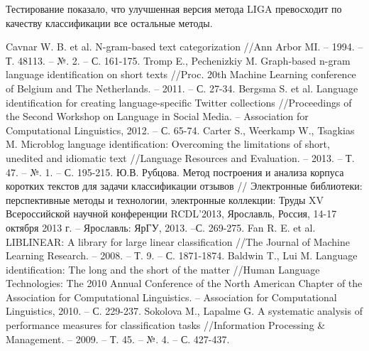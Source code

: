 \documentclass[a4paper, 14pt]{article}
\makeatletter
\renewcommand\appendixname{Приложение}
\def\redeflsection{\def\l@section{\@dottedtocline{1}{1.5em}{7.8em}}}
\renewcommand\appendix{\par
\setcounter{section}{0}%
\setcounter{subsection}{0}%
\def\@chapapp{\appendixname}%
\addtocontents{toc}{\protect\redeflsection}
\def\thesection{\appendixname\hspace{0.2cm}\@arabic\c@section}}
\makeatother
\begin{document}
		Тестирование показало, что улучшенная версия метода LIGA превосходит по качеству классификации все остальные методы.
		


  \begin{thebibliography}{99}
     Cavnar W. B. et al. N-gram-based text categorization //Ann Arbor MI. – 1994. – Т. 48113. – №. 2. – С. 161-175.
     Tromp E., Pechenizkiy M. Graph-based n-gram language identification on short texts //Proc. 20th Machine Learning conference of Belgium and The Netherlands. – 2011. – С. 27-34.
     Bergsma S. et al. Language identification for creating language-specific Twitter collections //Proceedings of the Second Workshop on Language in Social Media. – Association for Computational Linguistics, 2012. – С. 65-74.
     Carter S., Weerkamp W., Tsagkias M. Microblog language identification: Overcoming the limitations of short, unedited and idiomatic text //Language Resources and Evaluation. – 2013. – Т. 47. – №. 1. – С. 195-215.
     Ю.В. Рубцова. Метод построения и анализа корпуса коротких текстов для задачи классификации отзывов // Электронные библиотеки: перспективные методы и технологии, электронные коллекции: Труды XV Всероссийской научной конференции RCDL’2013, Ярославль, Россия, 14-17 октября 2013 г. – Ярославль: ЯрГУ, 2013. –С. 269-275.
     Fan R. E. et al. LIBLINEAR: A library for large linear classification //The Journal of Machine Learning Research. – 2008. – Т. 9. – С. 1871-1874.
     Baldwin T., Lui M. Language identification: The long and the short of the matter //Human Language Technologies: The 2010 Annual Conference of the North American Chapter of the Association for Computational Linguistics. – Association for Computational Linguistics, 2010. – С. 229-237.
     Sokolova M., Lapalme G. A systematic analysis of performance measures for classification tasks //Information Processing \& Management. – 2009. – Т. 45. – №. 4. – С. 427-437.
  \end{thebibliography}
  
 
  \appendix
  \pagebreak
\end{document}

